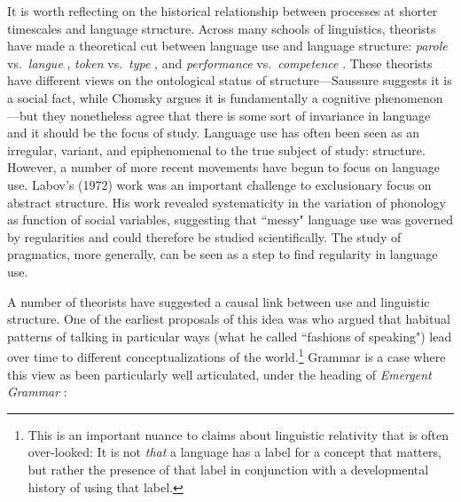 It is worth reflecting on the historical relationship between processes at shorter timescales and language structure. Across many schools of linguistics, theorists have made a theoretical cut between language use and language structure: {\it parole} vs.\  {\it langue}  \cite{saussure},  {\it token}  vs.\  {\it type}  \cite{peirce}, and  {\it performance}  vs.\  {\it competence}  \cite{chomsky1965aspects}. These theorists  have different views on the ontological status of structure---Saussure suggests it is a social fact, while Chomsky argues it is fundamentally a cognitive phenomenon---but they nonetheless agree that there is some sort of invariance in language and it should be the focus of study. Language use has often been seen as an irregular, variant, and epiphenomenal to the true subject of study: structure. However, a number of more recent movements have begun to focus on language use. \nocite{labov197213} Labov's (1972) work was an important challenge to exclusionary focus on abstract structure. His work revealed systematicity in the variation of phonology as function of social variables, suggesting that ``messy" language use was governed by regularities and could therefore be studied scientifically. The study of pragmatics, more generally, can be seen as a step to find regularity in language use. 

A number of theorists have suggested a causal link between use and linguistic structure. One of the earliest proposals of this idea was  who argued that habitual patterns of talking in particular ways (what he called ``fashions of speaking") lead over time to different conceptualizations of the world.\footnote{This is an important nuance to claims about linguistic relativity that is often over-looked: It is not {\it that} a language has a label for a concept that matters,  but rather the presence of that label in conjunction with a developmental history of using that label.} Grammar is a case where this view as been particularly well articulated, under the heading of {\it Emergent Grammar} \cite{hopper1987emergent}: 

